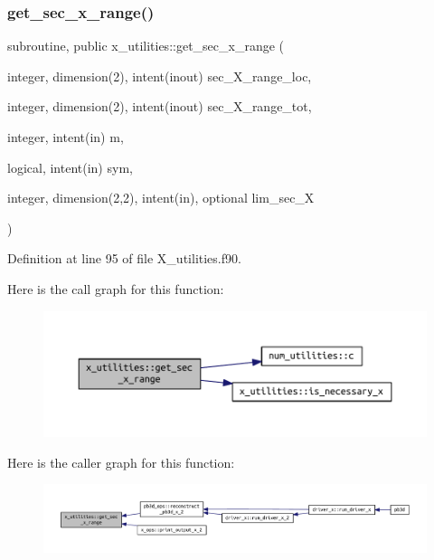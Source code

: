 \subsubsection{\texorpdfstring{get\+\_\+sec\+\_\+x\+\_\+range()}{get\_sec\_x\_range()}}
{\footnotesize\ttfamily subroutine, public x\+\_\+utilities\+::get\+\_\+sec\+\_\+x\+\_\+range (\begin{DoxyParamCaption}\item[{integer, dimension(2), intent(inout)}]{sec\+\_\+\+X\+\_\+range\+\_\+loc,  }\item[{integer, dimension(2), intent(inout)}]{sec\+\_\+\+X\+\_\+range\+\_\+tot,  }\item[{integer, intent(in)}]{m,  }\item[{logical, intent(in)}]{sym,  }\item[{integer, dimension(2,2), intent(in), optional}]{lim\+\_\+sec\+\_\+X }\end{DoxyParamCaption})}



Definition at line 95 of file X\+\_\+utilities.\+f90.

Here is the call graph for this function\+:
\nopagebreak
\begin{figure}[H]
\begin{center}
\leavevmode
\includegraphics[width=350pt]{namespacex__utilities_a6072ddd1fd230758795ff320c75a1f6a_cgraph}
\end{center}
\end{figure}
Here is the caller graph for this function\+:
\nopagebreak
\begin{figure}[H]
\begin{center}
\leavevmode
\includegraphics[width=350pt]{namespacex__utilities_a6072ddd1fd230758795ff320c75a1f6a_icgraph}
\end{center}
\end{figure}
\mbox{\label{namespacex__utilities_a689aca7fedb49c43c5a65a18d557259f}} 
